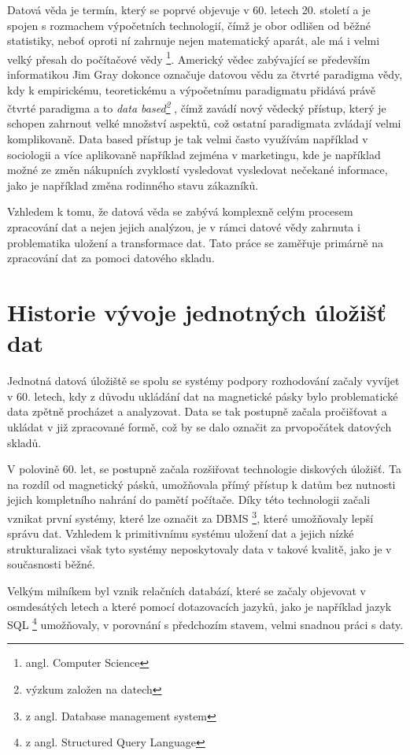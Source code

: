 \documentclass[
  digital,     %
  twoside,     %
  lof,         %
  lot,         %
]{fithesis4}
\begin{document}
 Datová věda je termín, který se poprvé objevuje v 60. letech 20. století a je spojen s rozmachem výpočetních technologií, čímž je obor odlišen od běžné statistiky, neboť  oproti ní zahrnuje nejen matematický aparát, ale má i velmi velký přesah do počítačové vědy \footnote{angl. Computer Science
 }.   \parencite{Foote2021} Americký vědec zabývající se především informatikou Jim Gray dokonce označuje datovou vědu za čtvrté paradigma vědy, kdy k empirickému, teoretickému a výpočetnímu paradigmatu přidává právě čtvrté paradigma a to \emph{data based\footnote{výzkum založen na datech}} \parencite{hey2009fourth}, čímž zavádí nový vědecký přístup, který je schopen zahrnout velké množství aspektů, což ostatní paradigmata zvládají velmi komplikovaně. Data based přístup je tak velmi často využívám například v sociologii a více aplikovaně například zejména v marketingu, kde je například možné ze změn nákupních zvyklostí vysledovat vysledovat nečekané informace, jako je například změna rodinného stavu zákazníků.\parencite{Zeleny2015}
 
Vzhledem k tomu, že datová věda se zabývá komplexně celým procesem zpracování dat a nejen jejich analýzou, je v rámci datové vědy zahrnuta i problematika uložení a transformace dat. Tato práce se zaměřuje primárně na zpracování dat za pomoci datového skladu. 

\chapter {Historie vývoje jednotných úložišť dat}
Jednotná datová úložiště se spolu se systémy podpory rozhodování začaly vyvíjet v 60. letech, kdy z důvodu ukládání dat na magnetické pásky bylo problematické data zpětně procházet a analyzovat. Data se tak postupně začala pročišťovat a ukládat v již zpracované formě, což by se dalo označit za prvopočátek datových skladů.\parencite[s.~2]{Inmon2005}

V polovině 60. let, se postupně začala rozšiřovat technologie diskových úložišť. Ta na rozdíl od magnetický pásků, umožňovala přímý přístup k datům bez nutnosti jejich kompletního nahrání do pamětí počítače. Díky této technologii začali vznikat první systémy, které lze označit za DBMS \footnote{z angl. Database management system}, které umožňovaly lepší správu dat.\parencite{Foote19042018} Vzhledem k primitivnímu systému uložení dat a jejich nízké strukturalizaci však tyto systémy neposkytovaly data v takové kvalitě, jako je v současnosti běžné.

Velkým milníkem byl vznik relačních databází, které se začaly objevovat v osmdesátých letech a které pomocí dotazovacích jazyků, jako je například jazyk SQL \footnote{z angl. Structured Query Language} umožňovaly, v porovnání s předchozím stavem, velmi snadnou práci s daty.\parencite{Foote19042018}
\end{document}
